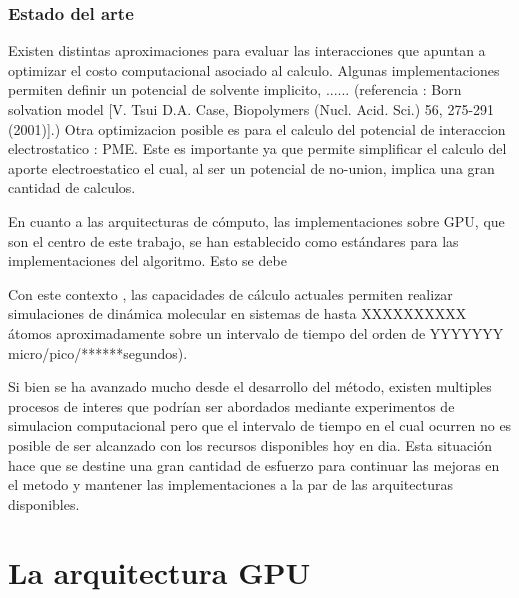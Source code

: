 \documentclass[a4paper,10pt]{report}
\begin{document}
\subsection{Estado del arte}


Existen distintas aproximaciones para evaluar las interacciones que apuntan a optimizar el costo computacional asociado al calculo. Algunas implementaciones permiten definir un potencial de solvente implicito, ...... (referencia : Born solvation model [V. Tsui  D.A. Case, Biopolymers (Nucl. Acid. Sci.) 56, 275-291 (2001)].)
Otra optimizacion posible es para el calculo del potencial de interaccion electrostatico : PME. Este es importante ya que permite simplificar el calculo del aporte electroestatico el cual, al ser un potencial de no-union, implica una gran cantidad de calculos.






En cuanto a las arquitecturas de cómputo, las implementaciones sobre GPU, que son el centro de este trabajo, se han establecido como estándares para las implementaciones del algoritmo. Esto se debe 


Con este contexto , las capacidades de cálculo actuales permiten realizar simulaciones de dinámica molecular en sistemas de hasta XXXXXXXXXX átomos aproximadamente sobre un intervalo de tiempo del orden de YYYYYYY  micro/pico/******segundos).

Si bien se ha avanzado mucho desde el desarrollo del método, existen multiples procesos de interes que podrían ser abordados mediante experimentos de simulacion computacional pero que el intervalo de tiempo en el cual ocurren no es posible de ser alcanzado con los recursos disponibles hoy en dia.
Esta situación hace que se destine una gran cantidad de esfuerzo para continuar las mejoras en el metodo y mantener las implementaciones a la par de las arquitecturas disponibles.




















\chapter{La arquitectura GPU}
\end{document}
